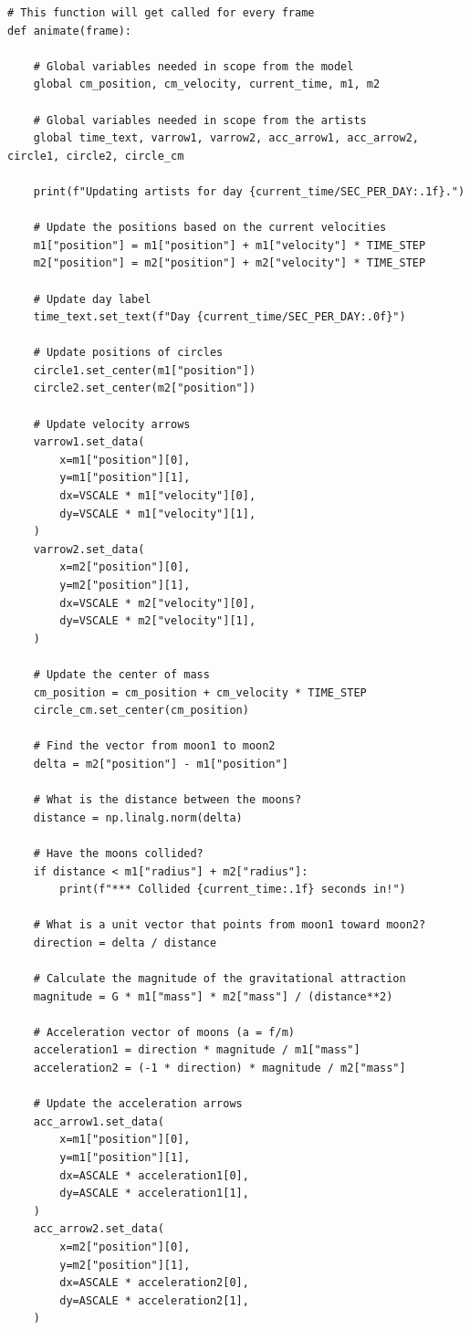 \begin{verbatim}
# This function will get called for every frame
def animate(frame):

    # Global variables needed in scope from the model
    global cm_position, cm_velocity, current_time, m1, m2

    # Global variables needed in scope from the artists
    global time_text, varrow1, varrow2, acc_arrow1, acc_arrow2, circle1, circle2, circle_cm

    print(f"Updating artists for day {current_time/SEC_PER_DAY:.1f}.")

    # Update the positions based on the current velocities
    m1["position"] = m1["position"] + m1["velocity"] * TIME_STEP
    m2["position"] = m2["position"] + m2["velocity"] * TIME_STEP

    # Update day label
    time_text.set_text(f"Day {current_time/SEC_PER_DAY:.0f}")

    # Update positions of circles
    circle1.set_center(m1["position"])
    circle2.set_center(m2["position"])

    # Update velocity arrows
    varrow1.set_data(
        x=m1["position"][0],
        y=m1["position"][1],
        dx=VSCALE * m1["velocity"][0],
        dy=VSCALE * m1["velocity"][1],
    )
    varrow2.set_data(
        x=m2["position"][0],
        y=m2["position"][1],
        dx=VSCALE * m2["velocity"][0],
        dy=VSCALE * m2["velocity"][1],
    )

    # Update the center of mass
    cm_position = cm_position + cm_velocity * TIME_STEP
    circle_cm.set_center(cm_position)

    # Find the vector from moon1 to moon2
    delta = m2["position"] - m1["position"]

    # What is the distance between the moons?
    distance = np.linalg.norm(delta)

    # Have the moons collided?
    if distance < m1["radius"] + m2["radius"]:
        print(f"*** Collided {current_time:.1f} seconds in!")

    # What is a unit vector that points from moon1 toward moon2?
    direction = delta / distance

    # Calculate the magnitude of the gravitational attraction
    magnitude = G * m1["mass"] * m2["mass"] / (distance**2)

    # Acceleration vector of moons (a = f/m)
    acceleration1 = direction * magnitude / m1["mass"]
    acceleration2 = (-1 * direction) * magnitude / m2["mass"]

    # Update the acceleration arrows
    acc_arrow1.set_data(
        x=m1["position"][0],
        y=m1["position"][1],
        dx=ASCALE * acceleration1[0],
        dy=ASCALE * acceleration1[1],
    )
    acc_arrow2.set_data(
        x=m2["position"][0],
        y=m2["position"][1],
        dx=ASCALE * acceleration2[0],
        dy=ASCALE * acceleration2[1],
    )


\end{verbatim}
